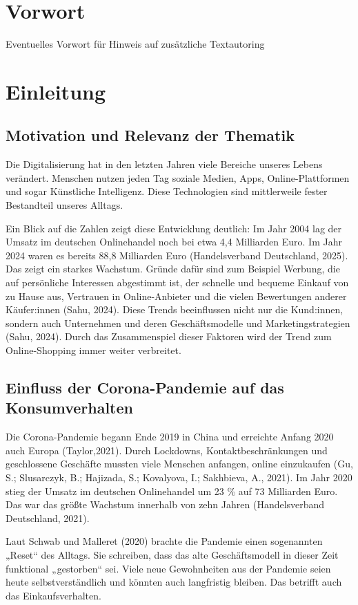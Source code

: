 \section{Vorwort}
Eventuelles Vorwort für Hinweis auf zusätzliche Textautoring


\section{Einleitung}
\subsection{Motivation und Relevanz der Thematik}
Die Digitalisierung hat in den letzten Jahren viele Bereiche unseres Lebens verändert. Menschen nutzen jeden Tag soziale Medien, Apps, Online-Plattformen und sogar Künstliche Intelligenz. Diese Technologien sind mittlerweile fester Bestandteil unseres Alltags. 

Ein Blick auf die Zahlen zeigt diese Entwicklung deutlich: Im Jahr 2004 lag der Umsatz im deutschen Onlinehandel noch bei etwa 4,4 Milliarden Euro. Im Jahr 2024 waren es bereits 88,8 Milliarden Euro (Handelsverband Deutschland, 2025). Das zeigt ein starkes Wachstum. Gründe dafür sind zum Beispiel Werbung, die auf persönliche Interessen abgestimmt ist, der schnelle und bequeme Einkauf von zu Hause aus, Vertrauen in Online-Anbieter und die vielen Bewertungen anderer Käufer:innen (Sahu, 2024). Diese Trends beeinflussen nicht nur die Kund:innen, sondern auch Unternehmen und deren Geschäftsmodelle und Marketingstrategien (Sahu, 2024). Durch das Zusammenspiel dieser Faktoren wird der Trend zum Online-Shopping immer weiter verbreitet. 

\subsection{Einfluss der Corona-Pandemie auf das Konsumverhalten}
Die Corona-Pandemie begann Ende 2019 in China und erreichte Anfang 2020 auch Europa (Taylor,2021). Durch Lockdowns, Kontaktbeschränkungen und geschlossene Geschäfte mussten viele Menschen anfangen, online einzukaufen (Gu, S.; Slusarczyk, B.; Hajizada, S.; Kovalyova, I.; Sakhbieva, A., 2021). Im Jahr 2020 stieg der Umsatz im deutschen Onlinehandel um 23 \% auf 73 Milliarden Euro. Das war das größte Wachstum innerhalb von zehn Jahren (Handelsverband Deutschland, 2021). 

Laut Schwab und Malleret (2020) brachte die Pandemie einen sogenannten „Reset“ des Alltags. Sie schreiben, dass das alte Geschäftsmodell in dieser Zeit funktional „gestorben“ sei. Viele neue Gewohnheiten aus der Pandemie seien heute selbstverständlich und könnten auch langfristig bleiben. Das betrifft auch das Einkaufsverhalten. 

